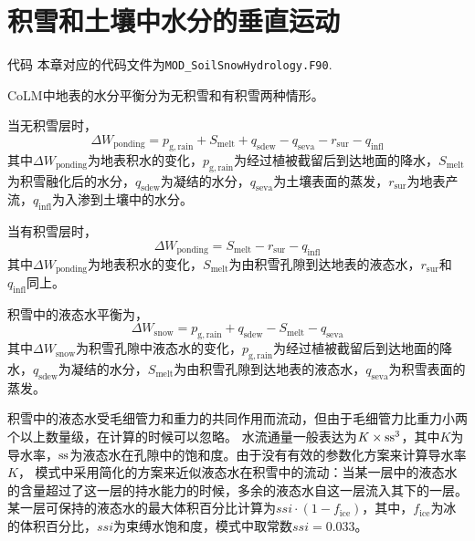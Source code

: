 \chapter{积雪和土壤中水分的垂直运动}\label{积雪和土壤中水分的垂直运动}

\begin{mymdframed}{代码}
  本章对应的代码文件为\texttt{MOD\_SoilSnowHydrology.F90}.
\end{mymdframed}

CoLM中地表的水分平衡分为无积雪和有积雪两种情形。

当无积雪层时，
\begin{equation}
  \Delta W_{\mathrm{ponding}} = p_{\mathrm{g,rain}}+S_{\mathrm{melt}}+q_{\mathrm{sdew}}-q_{\mathrm{seva}}-r_{\mathrm{sur}}-q_{\mathrm{infl}}
\end{equation}
其中$\Delta W_{\mathrm{ponding}}$为地表积水的变化，$p_{\mathrm{g,rain}}$为经过植被截留后到达地面的降水，$S_{\mathrm{melt}}$为积雪融化后的水分，$q_{\mathrm{sdew}}$为凝结的水分，$q_{\mathrm{seva}}$为土壤表面的蒸发，$r_{\mathrm{sur}}$为地表产流，$q_{\mathrm{infl}}$为入渗到土壤中的水分。

当有积雪层时，
\begin{equation}
  \Delta W_{\mathrm{ponding}} = S_{\mathrm{melt}}-r_{\mathrm{sur}}-q_{\mathrm{infl}}
\end{equation}
其中$\Delta W_{\mathrm{ponding}}$为地表积水的变化，$S_{\mathrm{melt}}$为由积雪孔隙到达地表的液态水，$r_{\mathrm{sur}}$和$q_{\mathrm{infl}}$同上。

积雪中的液态水平衡为，
\begin{equation}
  \Delta W_{\mathrm{snow}} = p_{\mathrm{g,rain}}+q_{\mathrm{sdew}}-S_{\mathrm{melt}}-q_{\mathrm{seva}}
\end{equation}
其中$\Delta W_{\mathrm{snow}}$为积雪孔隙中液态水的变化，$p_{\mathrm{g,rain}}$为经过植被截留后到达地面的降水，$q_{\mathrm{sdew}}$为凝结的水分，$S_{\mathrm{melt}}$为由积雪孔隙到达地表的液态水，$q_{\mathrm{seva}}$为积雪表面的蒸发。

积雪中的液态水受毛细管力和重力的共同作用而流动，但由于毛细管力比重力小两个以上数量级，在计算的时候可以忽略。
水流通量一般表达为$K\times{\rm ss}^3$，其中$K$为导水率，${\rm ss}$为液态水在孔隙中的饱和度。由于没有有效的参数化方案来计算导水率$K$，
模式中采用简化的方案来近似液态水在积雪中的流动：当某一层中的液态水的含量超过了这一层的持水能力的时候，多余的液态水自这一层流入其下的一层。
某一层可保持的液态水的最大体积百分比计算为$ssi\cdot\left(1-f_{\mathrm{ice}}\right)$，其中，$f_{\mathrm{ice}}$为冰的体积百分比，$ssi$为束缚水饱和度，模式中取常数$ssi=0.033$。

